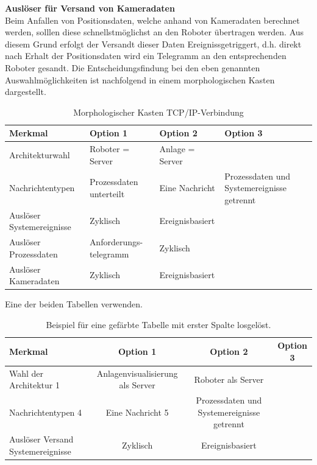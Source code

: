 \documentclass[ a4paper,
                oneside,
                toc=bibliography,
                toc=listof
                ]{scrbook}
\begin{document}
	\textbf{Auslöser für Versand von Kameradaten} \\
	Beim Anfallen von Positionsdaten, welche anhand von Kameradaten berechnet werden, solllen diese schnellstmöglichst an den Roboter übertragen werden. Aus diesem Grund erfolgt der Versandt dieser Daten Ereignissgetriggert, d.h. direkt nach Erhalt der Positionsdaten wird ein Telegramm an den entsprechenden Roboter gesandt.
	Die Entscheidungsfindung bei den eben genannten Auswahlmöglichkeiten ist nachfolgend in einem morphologischen Kasten dargestellt.
	\begin{longtable}{|p{3cm}|p{3.5cm}|p{3.5cm}|p{3.5cm}|}
		\caption{Morphologischer Kasten TCP/IP-Verbindung}
		\label{table:MorphoTCPIP}\\
		\hline
		Merkmal & Option 1 & Option 2 & Option 3 \\ [0.5ex] 
		\hline
		\endhead
		Architekturwahl & Roboter = Server & \cellcolor{green!10}Anlage = Server &\\ 
		Nachrichtentypen & Prozessdaten unterteilt & Eine Nachricht & \cellcolor{green!10}Prozessdaten und Systemereignisse getrennt\\
		Auslöser Systemereignisse & Zyklisch & \cellcolor{green!10}Ereignisbasiert&  \\
		Auslöser Prozessdaten & \cellcolor{green!10}Anforderungs-telegramm & Zyklisch &  \\
		Auslöser Kameradaten & Zyklisch & \cellcolor{green!10}Ereignisbasiert&  \\
		\hline
	\end{longtable}
	Eine der beiden Tabellen verwenden.
	\begin{table}
		\centering
		\begin{tabular}{>{\columncolor{gray!20}}lccc}
			\toprule
			\textbf{Merkmal} & \textbf{Option 1} & \textbf{Option 2} &  \textbf{Option 3}\\
			\midrule
			Wahl der Architektur 1 & \cellcolor{green!10}Anlagenvisualisierung als Server & Roboter als Server &\\
			Nachrichtentypen 4 & Eine Nachricht 5 & Prozessdaten und Systemereignisse getrennt & \\
			Auslöser Versand Systemereignisse & Zyklisch & \cellcolor{green!10}Ereignisbasiert & \\
			\bottomrule
		\end{tabular}
		\caption{Beispiel für eine gefärbte Tabelle mit erster Spalte losgelöst.}
		\label{tab:gefaerbte_tabelle_ohne_erste_spalte} 
	\end{table}\newline
\end{document}
